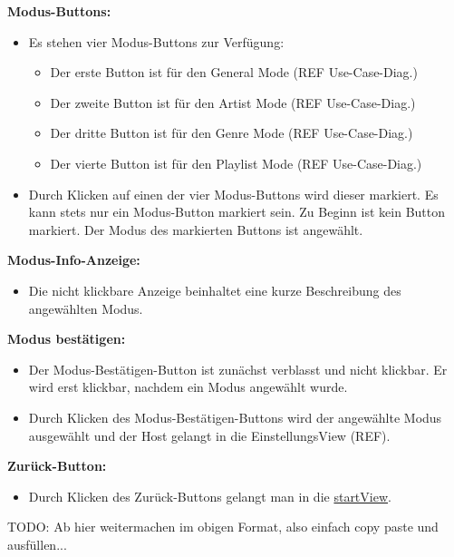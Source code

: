 \documentclass[oneside, ngerman]{sdqtechreport}
\begin{document}
\textbf{Modus-Buttons:}
\begin{itemize}
    \item Es stehen vier Modus-Buttons zur Verfügung:
    \begin{itemize}
        \item Der erste Button ist für den General Mode (REF Use-Case-Diag.)
        \item Der zweite Button ist für den Artist Mode (REF Use-Case-Diag.)
        \item Der dritte Button ist für den Genre Mode (REF Use-Case-Diag.)
        \item Der vierte Button ist für den Playlist Mode (REF Use-Case-Diag.)
    \end{itemize}
    \item Durch Klicken auf einen der vier Modus-Buttons wird dieser markiert. Es kann stets nur ein Modus-Button markiert sein. Zu Beginn ist kein Button markiert. Der Modus des markierten Buttons ist angewählt.
\end{itemize}

\textbf{Modus-Info-Anzeige:}
\begin{itemize}
    \item Die nicht klickbare Anzeige beinhaltet eine kurze Beschreibung des angewählten Modus.
\end{itemize}

\textbf{Modus bestätigen:}
\begin{itemize}
    \item Der Modus-Bestätigen-Button ist zunächst verblasst und nicht klickbar. Er wird erst klickbar, nachdem ein Modus angewählt wurde.
    \item Durch Klicken des Modus-Bestätigen-Buttons wird der angewählte Modus ausgewählt und der Host gelangt in die EinstellungsView (REF).
\end{itemize}

\textbf{Zurück-Button:}
\begin{itemize}
    \item Durch Klicken des Zurück-Buttons gelangt man in die  \hyperlink{startView}{startView}.
\end{itemize}

\newpage

TODO: Ab hier weitermachen im obigen Format, also einfach copy paste und ausfüllen...
\end{document}
